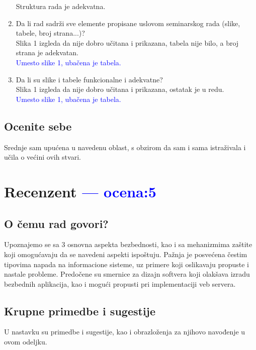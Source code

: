 \documentclass[a4paper]{report}
\newcommand{\odgovor}[1]{\textcolor{blue}{#1}}
\begin{document}
\begin{enumerate}
Struktura rada je adekvatna.
\item Da li rad sadrži sve elemente propisane uslovom seminarskog rada (slike, tabele, broj strana...)?\\
Slika 1 izgleda da nije dobro učitana i prikazana, tabela nije bilo, a broj strana je adekvatan.\\
\odgovor{Umesto slike 1, ubačena je tabela.}
\item Da li su slike i tabele funkcionalne i adekvatne?\\
Slika 1 izgleda da nije dobro učitana i prikazana, ostatak je u redu.\\
\odgovor{Umesto slike 1, ubačena je tabela.}

\end{enumerate}

\section{Ocenite sebe}
Srednje sam upućena u navedenu oblast, s obzirom da sam i sama istraživala i učila o većini ovih stvari.

\chapter{Recenzent \odgovor{--- ocena:5} }


\section{O čemu rad govori?}
Upoznajemo se sa 3 osnovna aspekta bezbednosti, kao i sa mehanizmima zaštite koji omogućavaju da se navedeni aspekti ispoštuju. Pažnja je posvećena čestim tipovima napada na informacione sisteme, uz primere koji oslikavaju propuste i nastale probleme. Predočene su smernice za dizajn softvera koji olakšava izradu bezbednih aplikacija, kao i mogući propusti pri implementaciji veb servera.

\section{Krupne primedbe i sugestije}
U nastavku su primedbe i sugestije, kao i obrazloženja za njihovo navođenje u ovom odeljku.
\end{document}
